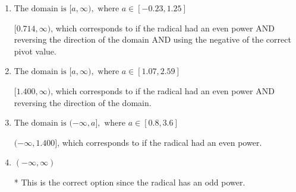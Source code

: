 \documentclass{extbook}[14pt]
\begin{document}
\begin{enumerate}
{\begin{enumerate}[label=\Alph*.]
$(-\infty, 0.714]$, which corresponds to if the radical had an even power AND using the negative of the correct pivot value.
\item \( \text{The domain is } [a, \infty), \text{   where } a \in [-0.23, 1.25] \)

$[0.714, \infty)$, which corresponds to if the radical had an even power AND reversing the direction of the domain AND using the negative of the correct pivot value.
\item \( \text{The domain is } [a, \infty), \text{   where } a \in [1.07, 2.59] \)

$[1.400, \infty)$, which corresponds to if the radical had an even power AND reversing the direction of the domain.
\item \( \text{The domain is } (-\infty, a], \text{   where } a \in [0.8, 3.6] \)

$(-\infty, 1.400]$, which corresponds to if the radical had an even power.
\item \( (-\infty, \infty) \)

* This is the correct option since the radical has an odd power.
\end{enumerate}

}
\end{enumerate}
\end{document}
